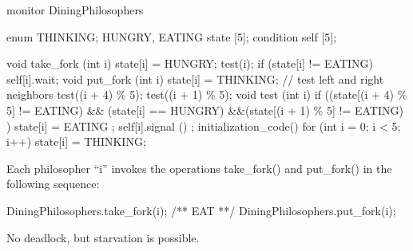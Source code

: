 \begin{codeInC}
monitor DiningPhilosophers{
    enum {THINKING; HUNGRY, EATING} state [5];
    condition self [5];
    
    void take_fork (int i) {
        state[i] = HUNGRY;
        test(i);
        if (state[i] != EATING)
        self[i].wait;
    }
    void put_fork (int i) {
        state[i] = THINKING;
        // test left and right neighbors
        test((i + 4) \% 5);
        test((i + 1) \% 5);
    }
    void test (int i) {
        if ((state[(i + 4) \% 5] != EATING) && (state[i] == HUNGRY) &&(state[(i + 1) \% 5] != EATING) ) {
            state[i] = EATING ;
            self[i].signal () ;
        }
    }
    initialization_code() {
        for (int i = 0; i < 5; i++)
            state[i] = THINKING;
    }
}
\end{codeInC}

Each philosopher “i” invokes the operations take\_fork() and
put\_fork() in the following sequence:

\begin{codeInC}
DiningPhilosophers.take_fork(i);
    /** EAT **/
DiningPhilosophers.put_fork(i);
\end{codeInC}

No deadlock, but starvation is possible.